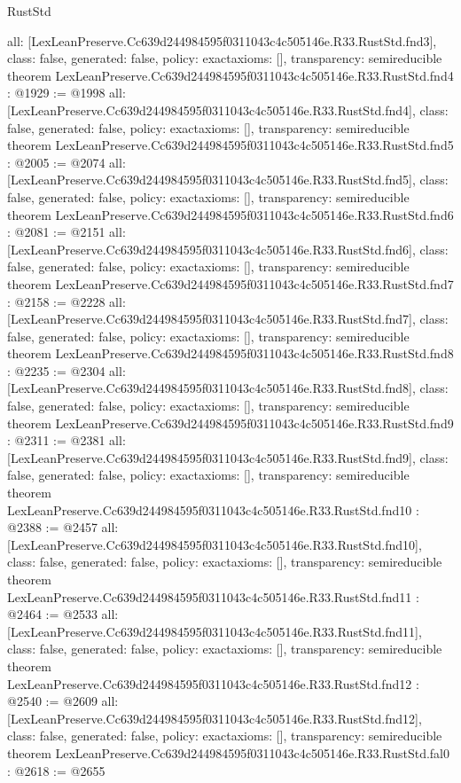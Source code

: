 \begin{lexlean}{RustStd}
\begin{coremodule}
{  all: [LexLeanPreserve.Cc639d244984595f0311043c4c505146e.R33.RustStd.fnd3],
  class: false,
  generated: false,
  policy: exact{axioms: []},
  transparency: semireducible
}
theorem LexLeanPreserve.Cc639d244984595f0311043c4c505146e.R33.RustStd.fnd4 : @1929 := @1998 {
  all: [LexLeanPreserve.Cc639d244984595f0311043c4c505146e.R33.RustStd.fnd4],
  class: false,
  generated: false,
  policy: exact{axioms: []},
  transparency: semireducible
}
theorem LexLeanPreserve.Cc639d244984595f0311043c4c505146e.R33.RustStd.fnd5 : @2005 := @2074 {
  all: [LexLeanPreserve.Cc639d244984595f0311043c4c505146e.R33.RustStd.fnd5],
  class: false,
  generated: false,
  policy: exact{axioms: []},
  transparency: semireducible
}
theorem LexLeanPreserve.Cc639d244984595f0311043c4c505146e.R33.RustStd.fnd6 : @2081 := @2151 {
  all: [LexLeanPreserve.Cc639d244984595f0311043c4c505146e.R33.RustStd.fnd6],
  class: false,
  generated: false,
  policy: exact{axioms: []},
  transparency: semireducible
}
theorem LexLeanPreserve.Cc639d244984595f0311043c4c505146e.R33.RustStd.fnd7 : @2158 := @2228 {
  all: [LexLeanPreserve.Cc639d244984595f0311043c4c505146e.R33.RustStd.fnd7],
  class: false,
  generated: false,
  policy: exact{axioms: []},
  transparency: semireducible
}
theorem LexLeanPreserve.Cc639d244984595f0311043c4c505146e.R33.RustStd.fnd8 : @2235 := @2304 {
  all: [LexLeanPreserve.Cc639d244984595f0311043c4c505146e.R33.RustStd.fnd8],
  class: false,
  generated: false,
  policy: exact{axioms: []},
  transparency: semireducible
}
theorem LexLeanPreserve.Cc639d244984595f0311043c4c505146e.R33.RustStd.fnd9 : @2311 := @2381 {
  all: [LexLeanPreserve.Cc639d244984595f0311043c4c505146e.R33.RustStd.fnd9],
  class: false,
  generated: false,
  policy: exact{axioms: []},
  transparency: semireducible
}
theorem LexLeanPreserve.Cc639d244984595f0311043c4c505146e.R33.RustStd.fnd10 : @2388 := @2457 {
  all: [LexLeanPreserve.Cc639d244984595f0311043c4c505146e.R33.RustStd.fnd10],
  class: false,
  generated: false,
  policy: exact{axioms: []},
  transparency: semireducible
}
theorem LexLeanPreserve.Cc639d244984595f0311043c4c505146e.R33.RustStd.fnd11 : @2464 := @2533 {
  all: [LexLeanPreserve.Cc639d244984595f0311043c4c505146e.R33.RustStd.fnd11],
  class: false,
  generated: false,
  policy: exact{axioms: []},
  transparency: semireducible
}
theorem LexLeanPreserve.Cc639d244984595f0311043c4c505146e.R33.RustStd.fnd12 : @2540 := @2609 {
  all: [LexLeanPreserve.Cc639d244984595f0311043c4c505146e.R33.RustStd.fnd12],
  class: false,
  generated: false,
  policy: exact{axioms: []},
  transparency: semireducible
}
theorem LexLeanPreserve.Cc639d244984595f0311043c4c505146e.R33.RustStd.fal0 : @2618 := @2655 {
}
\end{coremodule}
\end{lexlean}
